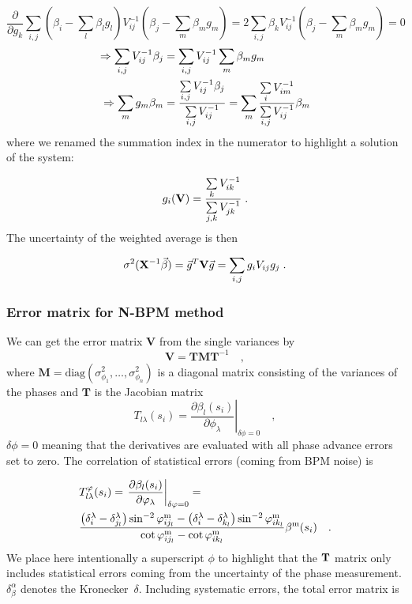 \[\frac{\partial}{\partial g_k}\sum\limits_{i,j} \left(\beta_i - \sum_l\beta_lg_l\right) V_{ij}^{-1} \left(\beta_j-\sum_m\beta_mg_m\right) = 2\sum_{i,j}\beta_kV_{ij}^{-1}\left(\beta_j - \sum_m\beta_mg_m\right) = 0\]
\begin{align}
\Rightarrow \sum_{i,j}V_{ij}^{-1}\beta_j&=\sum_{i,j}V_{ij}^{-1}\sum_m\beta_mg_m\notag \\
\Rightarrow\sum_mg_m\beta_m &= \frac{\sum\limits_{i,j}V_{ij}^{-1}\beta_j}{\sum\limits_{i,j}V_{ij}^{-1}}=\sum_m \frac{\sum\limits_i V_{im}^{-1}}{\sum\limits_{i,j}V_{ij}^{-1}}\beta_m
\end{align} where we renamed the summation index in the numerator to highlight a solution of the system:

\begin{equation}
g_i(\mathbf{V}) = \frac{\sum\limits_k V_{ik}^{-1}}{\sum\limits_{j,k}V_{jk}^{-1}}\; .
\end{equation}
The uncertainty of the weighted average is then

\begin{equation}
\sigma^2(\mathbf{X}^{-1}\vec{\beta}) = \vec{g}^T\mathbf{V}\vec{g} = \sum\limits_{i,j}g_iV_{ij}g_j\;.
\end{equation}

\subsubsection{Error matrix for N-BPM method}

We can get the error matrix $ \mathbf{V} $ from the single variances by
\begin{equation}
\mathbf{V} = \mathbf{T}\mathbf{M}\mathbf{T}^{-1}\quad ,
\label{eq:V}
\end{equation}
where $ \mathbf{M}=\text{diag}(\sigma^2_{\phi_1}, \ldots, \sigma^2_{\phi_n}) $ is a diagonal matrix consisting of the variances of the phases and $ \mathbf{T} $ is the Jacobian matrix
\begin{equation}
T_{l\lambda}(s_i) = \left.\frac{\partial \beta_l(s_i)}{\partial \phi_\lambda} \right|_{\delta\phi=0}\quad ,
\label{eq:Tij}
\end{equation}
$ \delta\phi=0 $ meaning that the derivatives are evaluated with all phase advance errors set to zero. The correlation of statistical errors (coming from BPM noise) is

\begin{align}
&T_{l\lambda}^\varphi(s_i) = \left.\frac{\partial \beta_l(s_i)}{\partial \varphi_\lambda}\right|_{\delta \varphi =0} =\notag\\ 
&\frac{
		\left(\delta_{i}^\lambda-\delta_{j_l}^\lambda\right)\sin^{-2}\varphi^\text{m}_{i{j_l}} -
		\left(\delta_{i}^\lambda-\delta_{k_l}^\lambda\right)\sin^{-2}\varphi_{i{k_l}}^\text{m}
	}
	{
		\cot \varphi_{i{j_l}}^\text{m} - \cot\varphi_{i{k_l}}^\text{m}
	}
\beta^\text{m}(s_i)\quad .
\label{eq:Tphiij}
\end{align}  
We place here intentionally a superscript $ \phi $ to highlight that the $ \mathbf{T} $ matrix only includes statistical errors coming from the uncertainty of the phase measurement. $\delta^\alpha_\beta $ denotes the Kronecker~$\delta$. Including systematic errors, the total error matrix is

